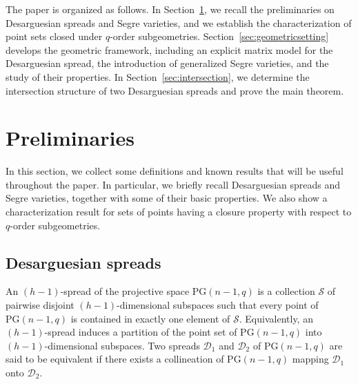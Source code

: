 \documentclass[11pt]{article}
\theoremstyle{definition}
\numberwithin{equation}{section}
\def\PG{\mathrm{PG}}
\begin{document}
The paper is organized as follows.
In Section~\ref{sec:preliminaries}, we recall the preliminaries on
Desarguesian spreads and Segre varieties, and we establish the characterization
of point sets closed under $q$-order subgeometries.
Section~\ref{sec:geometricsetting} develops the geometric framework, including
an explicit matrix model for the Desarguesian spread, the introduction of
generalized Segre varieties, and the study of their properties.
In Section~\ref{sec:intersection}, we determine the intersection structure of
two Desarguesian spreads and prove the main theorem.



\section{Preliminaries} \label{sec:preliminaries}

In this section, we collect some definitions and known results that will be
useful throughout the paper. In particular, we briefly recall Desarguesian spreads and Segre varieties, together with some of their basic properties. We also show a characterization result for sets of points having a closure property with respect to $q$-order subgeometries.

\subsection{Desarguesian spreads}

An $(h-1)$-spread of the projective space $\PG(n-1,q)$ is a collection
$\mathcal S$ of pairwise disjoint $(h-1)$-dimensional subspaces such that
every point of $\PG(n-1,q)$ is contained in exactly one element of
$\mathcal S$. Equivalently, an $(h-1)$-spread induces a partition of the
point set of $\PG(n-1,q)$ into $(h-1)$-dimensional subspaces.
Two spreads $\mathcal D_1$ and $\mathcal D_2$ of $\PG(n-1,q)$ are said to be
equivalent if there exists a collineation of $\PG(n-1,q)$ mapping
$\mathcal D_1$ onto $\mathcal D_2$.
\end{document}
